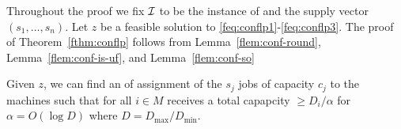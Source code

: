 \def\z{\bar z}
	    Throughout the proof we fix ${\cal I}$ to be the instance of \cckp and the supply vector $(s_1,\ldots,s_n)$.
	    Let  $z$ be a feasible solution to \eqref{feq:conflp1}-\eqref{feq:conflp3}. The proof of Theorem~\ref{fthm:conflp} follows from
	    Lemma~\ref{flem:conf-round}, Lemma~\ref{flem:conf-is-uf}, and Lemma~\ref{flem:conf-so}
	    \begin{lemma}\label{flem:conf-round}
	    	Given $z$, we can  find an of assignment of the $s_j$ jobs of capacity $c_j$  to the machines such that for all $i\in M$
	    	receives a total capapcity $\geq D_i/\alpha$ for $\alpha = O(\log D)$ where $D = D_\mathrm{max}/D_\mathrm{min}$.
	    \end{lemma}

